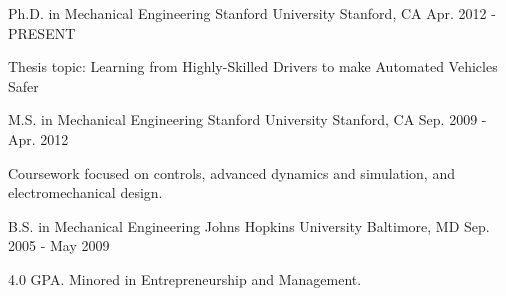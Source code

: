 \begin{cventries}
  \cventry
    {Ph.D. in Mechanical Engineering}
    {Stanford University}
    {Stanford, CA}
    {Apr. 2012 - PRESENT}
    {
      \begin{cvitems}
        \item {Thesis topic: Learning from Highly-Skilled Drivers to make Automated Vehicles Safer}
      \end{cvitems}
    }

  \cventry
    {M.S. in Mechanical Engineering}
    {Stanford University}
    {Stanford, CA}
    {Sep. 2009 - Apr. 2012}
    {
      \begin{cvitems}
        \item {Coursework focused on controls, advanced dynamics and simulation, and electromechanical design.}
      \end{cvitems}
    }

  \cventry
    {B.S. in Mechanical Engineering}
    {Johns Hopkins University}
    {Baltimore, MD}
    {Sep. 2005 - May 2009}
    {
      \begin{cvitems}
        \item {4.0 GPA. Minored in Entrepreneurship and Management.}
      \end{cvitems}
    }
\end{cventries}
